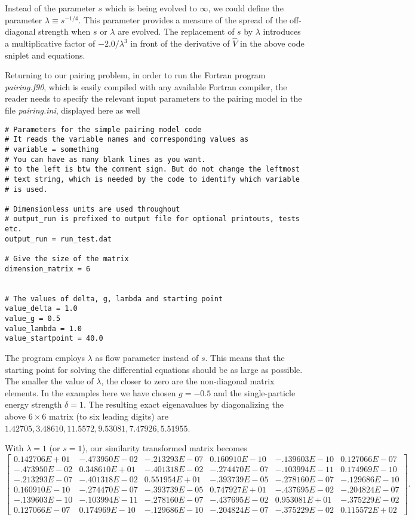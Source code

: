 Instead of the parameter $s$ which is being evolved to $\infty$, we could define 
the parameter $\lambda \equiv s^{-1/4}$. This parameter  provides a measure of the
spread of the off-diagonal strength when $s$ or $\lambda$ are evolved. The replacement of $s$ by $\lambda$ introduces a multiplicative factor 
of $-2.0/\lambda^3$ in front of the derivative of $\hat{V}$ in the above code sniplet and equations. 

Returning to our pairing problem, in order to run the Fortran program {\em pairing.f90}, which is easily compiled with any available Fortran compiler, the reader needs to specify the relevant input parameters to the pairing model in the file {\em pairing.ini}, displayed here as well
\begin{svgraybox}
\begin{lstlisting}
# Parameters for the simple pairing model code
# It reads the variable names and corresponding values as 
# variable = something
# You can have as many blank lines as you want.   
# to the left is btw the comment sign. But do not change the leftmost
# text string, which is needed by the code to identify which variable
# is used. 

# Dimensionless units are used throughout
# output_run is prefixed to output file for optional printouts, tests etc.
output_run = run_test.dat

# Give the size of the matrix
dimension_matrix = 6


# The values of delta, g, lambda and starting point
value_delta = 1.0
value_g = 0.5
value_lambda = 1.0
value_startpoint = 40.0
\end{lstlisting}
\end{svgraybox}
The program employs $\lambda$ as flow parameter instead of $s$. This means that the starting point for solving the differential equations
should be as large as possible. The smaller the value of $\lambda$, the closer to zero are the non-diagonal matrix elements. 
In the examples here we have chosen 
$g=-0.5$ and the single-particle energy strength $\delta=1$. The resulting exact eigenavalues by diagonalizing the above $6\times 6$ matrix (to six leading digits) are
$1.42705,   3.48610,  11.5572,   9.53081, 7.47926,   5.51955$.

With $\lambda=1$ (or $s=1$), our similarity transformed matrix becomes
\[
\begin{bmatrix}
0.142706E+01 &   -.473950E-02  &   -.213293E-07  &   0.160910E-10  &   -.139603E-10  &   0.127066E-07 \\
    -.473950E-02   &  0.348610E+01  &   -.401318E-02  &   -.274470E-07   &  -.103994E-11  &   0.174969E-10 \\
    -.213293E-07   &  -.401318E-02   &  0.551954E+01   &  -.393739E-05   &  -.278160E-07   &  -.129686E-10 \\
    0.160910E-10   &  -.274470E-07   &  -.393739E-05   &  0.747927E+01   &  -.437695E-02  &   -.204824E-07 \\
    -.139603E-10   &  -.103994E-11   &  -.278160E-07   &  -.437695E-02   &  0.953081E+01  &   -.375229E-02 \\
    0.127066E-07   &  0.174969E-10   &  -.129686E-10   &  -.204824E-07   &  -.375229E-02  &   0.115572E+02
\end{bmatrix}.
\]

